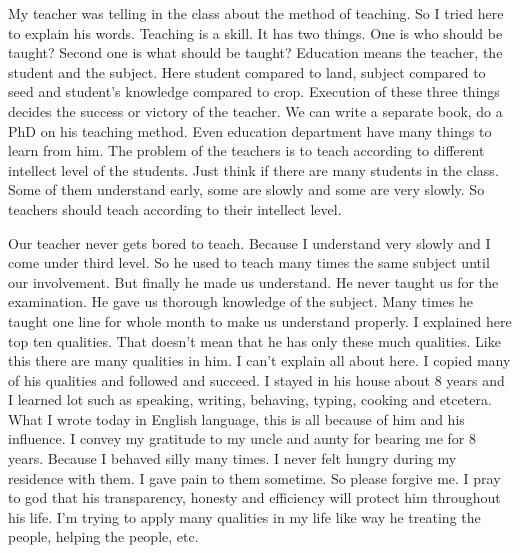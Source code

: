 My teacher was telling in the class about the method of teaching. So I tried here to explain his words. Teaching is a skill. It has two things. One is who should be taught? Second one is what should be taught? Education means the teacher, the student and the subject. Here student compared to land, subject compared to seed and student’s knowledge compared to crop. Execution of these three things decides the success or victory of the teacher. We can write a separate book, do a PhD on his teaching method. Even education department have many things to learn from him. The problem of the teachers is to teach according to different intellect level of the students. Just think if there are many students in the class. Some of them understand early, some are slowly and some are very slowly. So teachers should teach according to their intellect level.

Our teacher never gets bored to teach. Because I understand very slowly and I come under third level. So he used to teach many times the same subject until our involvement. But finally he made us understand. He never taught us for the examination. He gave us thorough knowledge of the subject. Many times he taught one line for whole month to make us understand properly.
I explained here top ten qualities. That doesn’t mean that he has only these much qualities. Like this there are many qualities in him. I can’t explain all about here. I copied many of his qualities and followed and succeed. I stayed in his house about 8 years and I learned lot such as speaking, writing, behaving, typing, cooking and etcetera. What I wrote today in English language, this is all because of him and his influence. I convey my gratitude to my uncle and aunty for bearing me for 8 years. Because I behaved silly many times. I never felt hungry during my residence with them. I gave pain to them sometime. So please forgive me. I pray to god that his transparency, honesty and efficiency will protect him throughout his life. I’m trying to apply many qualities in my life like way he treating the people, helping the people, etc.

\articleend
